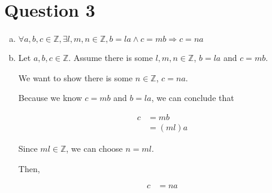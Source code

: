 \documentclass[12pt]{article}
\begin{document}
\section*{Question 3}
\begin{enumerate}[a.]
    \item

    $\forall a,b,c \in \mathbb{Z}, \exists l,m,n \in \mathbb{Z}, b = la \land c = mb
    \Rightarrow c = na$

    \item

    Let $a,b,c \in \mathbb{Z}$. Assume there is some $l,m,n \in \mathbb{Z}$,
    $b = la$ and $c = mb$.

    \bigskip

    We want to show there is some $n \in \mathbb{Z}$, $c = na$.

    \bigskip

    Because we know $c = mb$ and $b = la$, we can conclude that

    \begin{align}
        c &= mb\\
        &= (ml)a
    \end{align}

    \bigskip

    Since $ml \in \mathbb{Z}$, we can choose $n = ml$.

    \bigskip

    Then,

    \begin{align}
        c &= na
    \end{align}

\end{enumerate}
\end{document}
